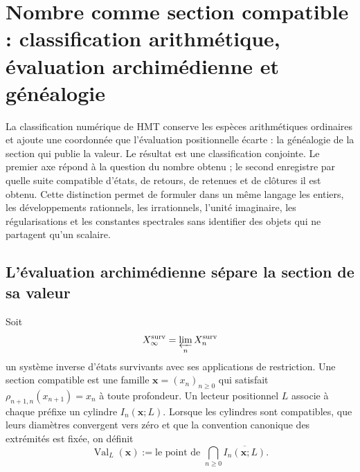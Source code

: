 \label{chap:p3-83-44-clasificacion_numero}









\section[Nombre comme section compatible]{Nombre comme section
compatible : classification arithmétique, évaluation archimédienne et
généalogie}
\label{p3-83-c44-s1:sec:ontologia-numeros-rev11}

La classification numérique de HMT conserve les espèces arithmétiques
ordinaires et ajoute une coordonnée que l’évaluation positionnelle écarte : la
généalogie de la section qui publie la valeur. Le résultat est une
classification conjointe. Le premier axe répond à la question du nombre obtenu ; le
second enregistre par quelle suite compatible d’états, de retours,
de retenues et de clôtures il est obtenu. Cette distinction permet de formuler dans un même
langage les entiers, les développements rationnels, les irrationnels, l’unité
imaginaire, les régularisations et les constantes spectrales sans identifier
des objets qui ne partagent qu’un scalaire.

\subsection{L’évaluation archimédienne sépare la section de sa valeur}

Soit
\[
 X_{\infty}^{\rm surv}
 =\varprojlim_n X_n^{\rm surv}
\]
un système inverse d’états survivants avec ses applications de
restriction. Une section compatible est une famille
\(\boldsymbol x=(x_n)_{n\geq0}\) qui satisfait
\(\rho_{n+1,n}(x_{n+1})=x_n\) à toute profondeur. Un lecteur positionnel
\(L\) associe à chaque préfixe un cylindre \(I_n(\boldsymbol x;L)\). Lorsque les
cylindres sont compatibles, que leurs diamètres convergent vers zéro et que la
convention canonique des extrémités est fixée, on définit
\begin{equation}
 \operatorname{Val}_{L}(\boldsymbol x)
 :=\text{le point de }
 \bigcap_{n\geq0}\overline{I_n(\boldsymbol x;L)}.
 \label{p3-83-c44-s1:eq:valor-lector-seccion-rev11}
\end{equation}

